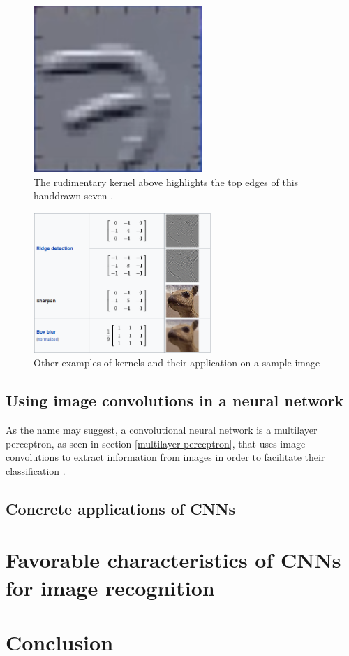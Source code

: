 \documentclass[12pt,a4paper,notitlepage]{article}
\begin{document}
\begin{figure}[htbp]
	\centering
		\includegraphics{images/edge-highlighting-kernel.png}
	\caption{The rudimentary kernel above highlights the top edges of this handdrawn seven \cite{deep_lizard_convolutional_2017}.}
	\label{fig:edge-highlighting-kernel}
\end{figure}

\begin{figure}[htbp]
	\centering
		\includegraphics[width=0.6\textwidth]{images/image-convolutions-examples.png}
	\caption{Other examples of kernels and their application on a sample image \cite{noauthor_kernel_2022}}
	\label{fig:image-convolutions-examples}
\end{figure}


\subsection{Using image convolutions in a neural network}
As the name may suggest, a convolutional neural network is a multilayer perceptron, as seen in section \ref{multilayer-perceptron}, that uses image convolutions to extract information from images in order to facilitate their classification \cite{deep_lizard_convolutional_2017}.

\subsection{Concrete applications of CNNs}

\section{Favorable characteristics of CNNs for image recognition}

\section{Conclusion}

\clearpage
\begin{flushleft}


\end{flushleft}
\end{document}
